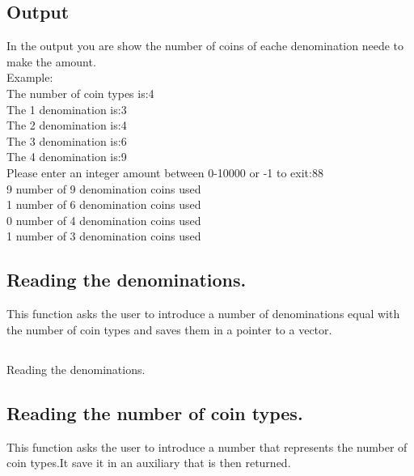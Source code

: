 \documentclass{report}
\begin{document}
\newpage
\subsection*{Output}
In the output you are show the number of coins of eache denomination neede to make the amount.
\\
Example:
\\
The number of coin types is:4
\\
The 1 denomination is:3
\\
The 2 denomination is:4
\\
The 3 denomination is:6
\\
The 4 denomination is:9
\\
Please enter an integer amount between 0-10000 or -1 to exit:88
\\
9 number of 9 denomination coins used
\\
1 number of 6 denomination coins used
\\
0 number of 4 denomination coins used
\\
1 number of 3 denomination coins used

\subsection*{Reading the denominations.}
This function asks the user to introduce a number of denominations equal with the number of coin types and saves them in a pointer to a vector.
\subsection*{}

\begin{algorithm}[H]
    \caption{Reading the denominations.}
\end{algorithm}
\subsection*{}

\subsection*{Reading the number of coin types.}
This function asks the user to introduce a number that represents the number of coin types.It save it in an auxiliary that is then returned.
\end{document}
